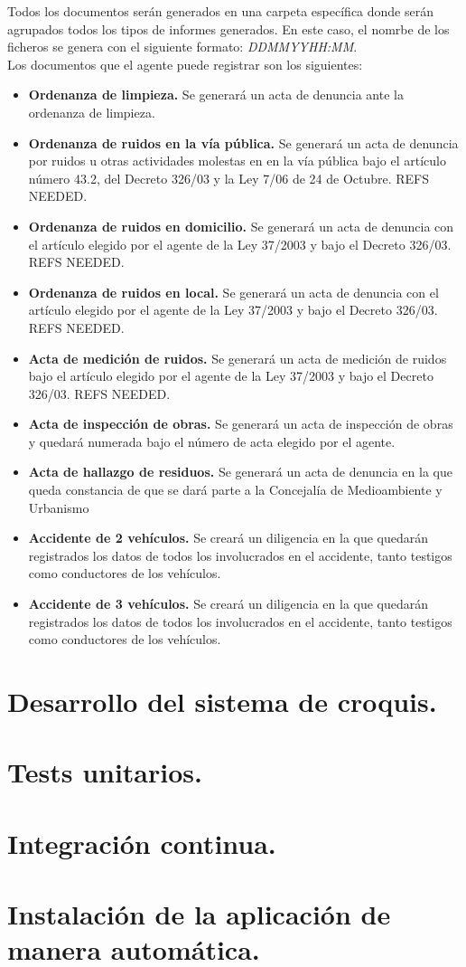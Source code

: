 Todos los documentos serán generados en una carpeta específica donde serán agrupados todos los tipos de informes generados. En este caso, el nomrbe de los ficheros se
genera con el siguiente formato: \textit{DD\textunderscore MM\textunderscore YY\textunderscore HH:MM}.\\

Los documentos que el agente puede registrar son los siguientes:

\begin{itemize}
	\item \textbf{Ordenanza de limpieza. } Se generará un acta de denuncia ante la ordenanza de limpieza.
	\item \textbf{Ordenanza de ruidos en la vía pública. } Se generará un acta de denuncia por ruidos u otras actividades molestas en en la vía pública bajo el artículo número
	43.2, del Decreto 326/03 y la Ley 7/06 de 24 de Octubre. REFS NEEDED.
	\item \textbf{Ordenanza de ruidos en domicilio. } Se generará un acta de denuncia con el artículo elegido por el agente de la Ley 37/2003 y bajo el Decreto 326/03. REFS NEEDED.
	\item \textbf{Ordenanza de ruidos en local. }  Se generará un acta de denuncia con el artículo elegido por el agente de la Ley 37/2003 y bajo el Decreto 326/03. REFS NEEDED.
	\item \textbf{Acta de medición de ruidos. } Se generará un acta de medición de ruidos bajo el artículo elegido por el agente de la Ley 37/2003 y bajo el Decreto 326/03. REFS NEEDED.
	\item \textbf{Acta de inspección de obras. }  Se generará un acta de inspección de obras y quedará numerada bajo el número de acta elegido por el agente.
	\item \textbf{Acta de hallazgo de residuos. } Se generará un acta de denuncia en la que queda constancia de que se dará parte a la Concejalía de Medioambiente y Urbanismo
	\item \textbf{Accidente de 2 vehículos. } Se creará un diligencia en la que quedarán registrados los datos de todos los involucrados en el accidente, tanto testigos como 
	conductores de los vehículos.
	\item \textbf{Accidente de 3 vehículos. } Se creará un diligencia en la que quedarán registrados los datos de todos los involucrados en el accidente, tanto testigos como 
	conductores de los vehículos.
\end{itemize}

\section{Desarrollo del sistema de croquis.}

\section{Tests unitarios.}

\section{Integración continua.}

\section{Instalación de la aplicación de manera automática.}


